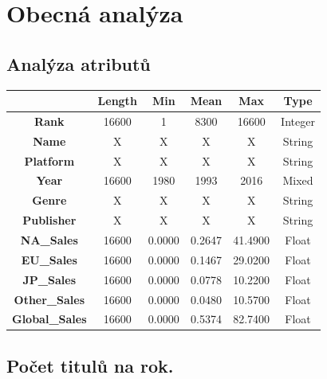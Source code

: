 \documentclass[a4paper,11pt]{article}
\begin{document}
\newpage

\section{Obecná analýza}


\subsection{Analýza atributů}
\begin{center}
\begin{tabular}{|c|c|c|c|c|c|}
\hline
\textbf{}              & \textbf{Length} & \textbf{Min} & \textbf{Mean} & \textbf{Max} & \textbf{Type} \\ \hline
\textbf{Rank}          & 16600           & 1            & 8300          & 16600        & Integer       \\ \hline
\textbf{Name}          & X               & X            & X             & X            & String        \\ \hline
\textbf{Platform}      & X               & X            & X             & X            & String        \\ \hline
\textbf{Year}          & 16600           & 1980         & 1993          & 2016         & Mixed         \\ \hline
\textbf{Genre}         & X               & X            & X             & X            & String        \\ \hline
\textbf{Publisher}     & X               & X            & X             & X            & String        \\ \hline
\textbf{NA\_Sales}     & 16600           & 0.0000       & 0.2647        & 41.4900      & Float         \\ \hline
\textbf{EU\_Sales}     & 16600           & 0.0000       & 0.1467        & 29.0200      & Float         \\ \hline
\textbf{JP\_Sales}     & 16600           & 0.0000       & 0.0778        & 10.2200      & Float         \\ \hline
\textbf{Other\_Sales}  & 16600           & 0.0000       & 0.0480        & 10.5700      & Float         \\ \hline
\textbf{Global\_Sales} & 16600           & 0.0000       & 0.5374        & 82.7400      & Float         \\ \hline
\end{tabular}
\end{center}


\subsection{Počet titulů na rok.}
\end{document}
